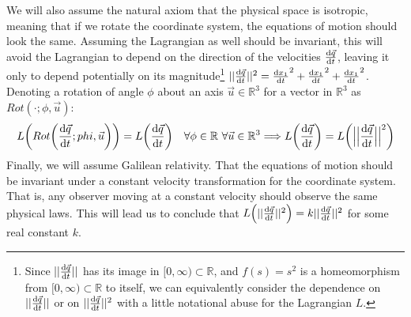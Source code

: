 \documentclass[11pt, a4paper]{article} %
\newcommand{\R}{\mathbb{R}} %
\begin{document}
We will also assume the natural axiom that the physical space is isotropic, meaning that if we rotate the coordinate system, the equations of motion should look the same. Assuming the Lagrangian as well should be invariant, this will avoid the Lagrangian to depend on the direction of the velocities $\dv{\vec{q}}{t}$, leaving it only to depend potentially on its magnitude\footnote{Since $||\dv{\vec{q}}{t}||$ has its image in $[0,\infty)\subset\R$, and $f(s)=s^2$ is a homeomorphism from $[0,\infty)\subset\R$ to itself, we can equivalently consider the dependence on $||\dv{\vec{q}}{t}||$ or on $||\dv{\vec{q}}{t}||^2$ with a little notational abuse for the Lagrangian $L$.} $||\dv{\vec{q}}{t}||^2=\dv{x_1}{t}^2+\dv{x_1}{t}^2+\dv{x_1}{t}^2$. Denoting a rotation of angle $\phi$ about an axis $\vec{u}\in\R^3$ for a vector in $\R^3$ as $Rot(\cdot;\phi, \vec{u})$:
\begin{equation}
L\qty( Rot\qty( \dv{\vec{q}}{t}; phi, \vec{u} ))=L\qty( \dv{\vec{q}}{t})\quad \forall \phi\in\R\ \forall \vec{u}\in \R^3 \Longrightarrow L\qty(\dv{\vec{q}}{t})=L\qty( \Big|\Big|\dv{\vec{q}}{t}\Big|\Big|^2)
\end{equation}
Finally, we will assume Galilean relativity. That the equations of motion should be invariant under a constant velocity transformation for the coordinate system. That is, any observer moving at a constant velocity should observe the same physical laws. This will lead us to conclude that $L\qty( ||\dv{\vec{q}}{t}||^2)=k ||\dv{\vec{q}}{t}||^2$ for some real constant $k$.
\end{document}
